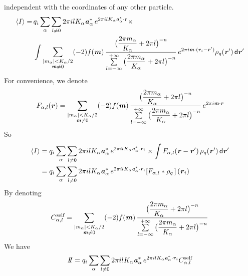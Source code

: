 \documentclass[aps,pre,preprint]{revtex4}
\renewcommand{\v}[1]{\textbf{\textit{#1}}}
\renewcommand{\d}[1]{\textsf{#1}}
\begin{document}
independent with the coordinates of any other particle.
\begin{align}\nonumber
  \langle I\rangle
  =&\,
  q_i\sum_{\alpha}\sum_{l\neq 0}
  2\pi i l K_\alpha\v a_\alpha^\ast\,e^{2\pi i l K_\alpha\v a^\ast_\alpha\cdot \v r} \times\\\nonumber
  &\,
  \int
  \sum_{
    \begin{subarray}{c}
      \vert m_{\alpha}\vert < K_\alpha/2\\
      \v m\neq 0
    \end{subarray}}
  (-2)f(\v m)\,
  \frac
  {\big(\dfrac{2\pi m_\alpha}{K_\alpha} + 2\pi l\big)^{-n}}
  {\sum\limits_{l=-\infty}^{+\infty}
    \big(\dfrac{2\pi m_\alpha}{K_\alpha} + 2\pi l\big)^{-n}}\,
  e^{2\pi i\v m\cdot (\v r_i - \v r')}\rho_q(\v r')
  \,\d d\v r'
\end{align}
For convenience, we denote
\begin{align}
  F_{\alpha,l} (\v r)=
  \sum_{
    \begin{subarray}{c}
      \vert m_{\alpha}\vert < K_\alpha/2\\
      \v m\neq 0
    \end{subarray}}
  (-2)f(\v m)\,
  \frac
  {\big(\dfrac{2\pi m_\alpha}{K_\alpha} + 2\pi l\big)^{-n}}
  {\sum\limits_{l=-\infty}^{+\infty}
    \big(\dfrac{2\pi m_\alpha}{K_\alpha} + 2\pi l\big)^{-n}}\,
  e^{2\pi i\v m\cdot \v r}
\end{align}
So
\begin{align}
  \langle I\rangle &=
  q_i\sum_{\alpha}\sum_{l\neq 0}
  2\pi i l K_\alpha\v a_\alpha^\ast\,e^{2\pi i l K_\alpha\v a^\ast_\alpha\cdot \v r_i} \times
  \int
  F_{\alpha,l}(\v r - \v r')\,\rho_q(\v r')
  \,\d d\v r' \\
  &=
  q_i\sum_{\alpha}\sum_{l\neq 0}
  2\pi i l K_\alpha\v a_\alpha^\ast\,e^{2\pi i l K_\alpha\v a^\ast_\alpha\cdot \v r_i}
  [F_{\alpha,l}\ast\rho_q\,]\,(\v r_i)
\end{align}
By denoting
\begin{align}
  C_{\alpha,l}^{\textrm{self}}
  = 
  \sum_{
    \begin{subarray}{c}
      \vert m_{\alpha}\vert < K_\alpha/2\\
      \v m\neq 0
    \end{subarray}}
  (-2)f(\v m)\,
  \frac
  {\big(\dfrac{2\pi m_\alpha}{K_\alpha} + 2\pi l\big)^{-n}}
  {\sum\limits_{l=-\infty}^{+\infty}
    \big(\dfrac{2\pi m_\alpha}{K_\alpha} + 2\pi l\big)^{-n}}\,
\end{align}
We have
\begin{align}
  I\negthickspace I =
  q_i\sum_{\alpha}\sum_{l\neq 0}
  2\pi i l K_\alpha\v a_\alpha^\ast\,e^{2\pi i l K_\alpha\v a^\ast_\alpha\cdot \v r_i}
  C_{\alpha,l}^{\textrm{self}}
\end{align}
\end{document}

